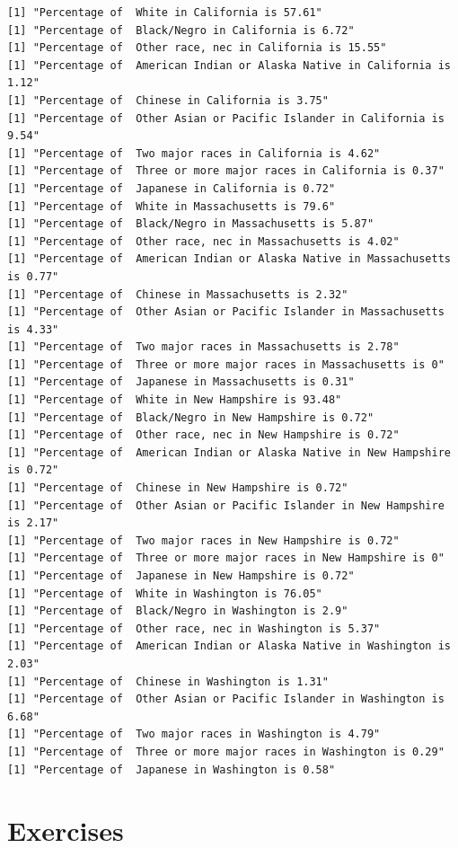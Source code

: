 \documentclass[
  letterpaper,
]{book}
\theoremstyle{definition}
\theoremstyle{definition}
\theoremstyle{plain}
\theoremstyle{definition}
\theoremstyle{plain}
\theoremstyle{plain}
\theoremstyle{remark}
\begin{document}
\begin{verbatim}
[1] "Percentage of  White in California is 57.61"
[1] "Percentage of  Black/Negro in California is 6.72"
[1] "Percentage of  Other race, nec in California is 15.55"
[1] "Percentage of  American Indian or Alaska Native in California is 1.12"
[1] "Percentage of  Chinese in California is 3.75"
[1] "Percentage of  Other Asian or Pacific Islander in California is 9.54"
[1] "Percentage of  Two major races in California is 4.62"
[1] "Percentage of  Three or more major races in California is 0.37"
[1] "Percentage of  Japanese in California is 0.72"
[1] "Percentage of  White in Massachusetts is 79.6"
[1] "Percentage of  Black/Negro in Massachusetts is 5.87"
[1] "Percentage of  Other race, nec in Massachusetts is 4.02"
[1] "Percentage of  American Indian or Alaska Native in Massachusetts is 0.77"
[1] "Percentage of  Chinese in Massachusetts is 2.32"
[1] "Percentage of  Other Asian or Pacific Islander in Massachusetts is 4.33"
[1] "Percentage of  Two major races in Massachusetts is 2.78"
[1] "Percentage of  Three or more major races in Massachusetts is 0"
[1] "Percentage of  Japanese in Massachusetts is 0.31"
[1] "Percentage of  White in New Hampshire is 93.48"
[1] "Percentage of  Black/Negro in New Hampshire is 0.72"
[1] "Percentage of  Other race, nec in New Hampshire is 0.72"
[1] "Percentage of  American Indian or Alaska Native in New Hampshire is 0.72"
[1] "Percentage of  Chinese in New Hampshire is 0.72"
[1] "Percentage of  Other Asian or Pacific Islander in New Hampshire is 2.17"
[1] "Percentage of  Two major races in New Hampshire is 0.72"
[1] "Percentage of  Three or more major races in New Hampshire is 0"
[1] "Percentage of  Japanese in New Hampshire is 0.72"
[1] "Percentage of  White in Washington is 76.05"
[1] "Percentage of  Black/Negro in Washington is 2.9"
[1] "Percentage of  Other race, nec in Washington is 5.37"
[1] "Percentage of  American Indian or Alaska Native in Washington is 2.03"
[1] "Percentage of  Chinese in Washington is 1.31"
[1] "Percentage of  Other Asian or Pacific Islander in Washington is 6.68"
[1] "Percentage of  Two major races in Washington is 4.79"
[1] "Percentage of  Three or more major races in Washington is 0.29"
[1] "Percentage of  Japanese in Washington is 0.58"
\end{verbatim}

\hypertarget{exercises}{%
\section*{Exercises}\label{exercises}}
\end{document}
